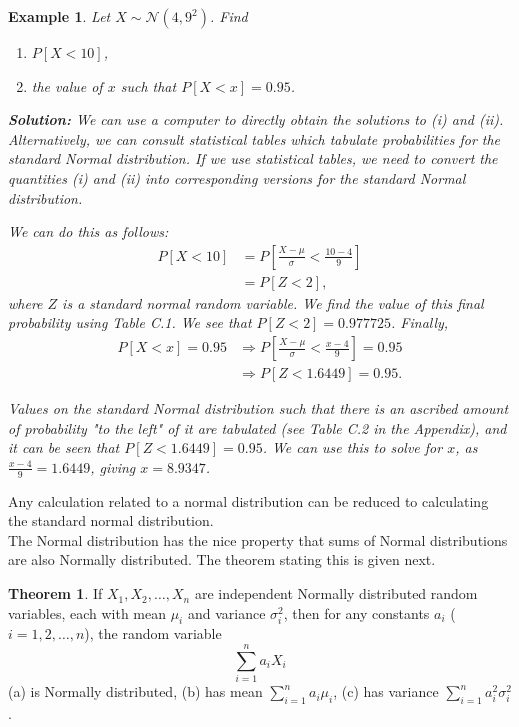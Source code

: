 \documentclass[12pt,a4paper]{article}
\theoremstyle{example}
\newtheorem{example}{Example}
\theoremstyle{definition}
\theoremstyle{theorem}
\newtheorem{theorem}{Theorem}
\begin{document}
\begin{example}
    Let \(X \sim \mathcal{N}(4, 9^2)\). Find
\begin{enumerate}
    \item \(P[X < 10]\),
    \item the value of \(x\) such that \(P[X < x] = 0.95\).
\end{enumerate}

\textbf{Solution:} We can use a computer to directly obtain the solutions to (i) and (ii). Alternatively, we can consult statistical tables which tabulate probabilities for the standard Normal distribution. If we use statistical tables, we need to convert the quantities (i) and (ii) into corresponding versions for the standard Normal distribution.

We can do this as follows:
\begin{align*}
    P[X < 10] &= P\left[\frac{X - \mu}{\sigma} < \frac{10 - 4}{9}\right] \\
    &= P[Z < 2],
\end{align*}
where \(Z\) is a standard normal random variable. We find the value of this final probability using Table C.1. We see that \(P[Z < 2] = 0.977725\). Finally,
\begin{align*}
    P[X < x] = 0.95 &\Rightarrow P\left[\frac{X - \mu}{\sigma} < \frac{x - 4}{9}\right] = 0.95 \\
    &\Rightarrow P[Z < 1.6449] = 0.95.
\end{align*}

Values on the standard Normal distribution such that there is an ascribed amount of probability "to the left" of it are tabulated (see Table C.2 in the Appendix), and it can be seen that \(P[Z < 1.6449] = 0.95\). We can use this to solve for \(x\), as \(\frac{x - 4}{9} = 1.6449\), giving \(x = 8.9347\).

\end{example}
Any calculation related to a normal distribution can be reduced to calculating the standard normal distribution.\\
The Normal distribution has the nice property that sums of Normal distributions
are also Normally distributed. The theorem stating this is given next.\\
\begin{theorem}
If \(X_1, X_2, \ldots, X_n\) are independent Normally distributed random variables, each with mean \(\mu_i\) and variance \(\sigma_i^2\), then for any constants \(a_i\) (\(i = 1, 2, \ldots, n\)), the random variable
\[
\sum_{i=1}^{n} a_i X_i
\]
(a) is Normally distributed,
(b) has mean \(\sum_{i=1}^{n} a_i \mu_i\),
(c) has variance \(\sum_{i=1}^{n} a_i^2 \sigma_i^2\).    
\end{theorem}
\end{document}
